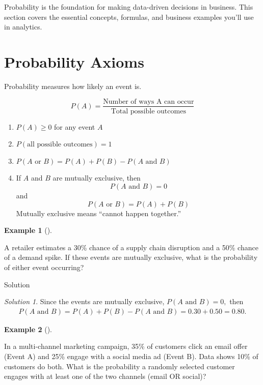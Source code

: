 \documentclass[
  12pt,
  letterpaper,
]{scrbook}
\providecommand{\tightlist}{%
  \setlength{\itemsep}{0pt}\setlength{\parskip}{0pt}}
\renewcommand{\tightlist}{\setlength{\itemsep}{0.5\baselineskip}\setlength{\parskip}{0.2\baselineskip}}
\theoremstyle{definition}
\newtheorem{example}{Example}[chapter]
\theoremstyle{plain}
\theoremstyle{remark}
\newtheorem{refsolution}{Solution}[chapter]
\begin{document}
Probability is the foundation for making data-driven decisions in
business. This section covers the essential concepts, formulas, and
business examples you'll use in analytics.

\section{Probability Axioms}\label{probability-axioms}

Probability measures how likely an event is.

\[P(A) = \frac{\text{Number of ways A can occur}}{\text{Total possible outcomes}}\]

\begin{enumerate}
\def\labelenumi{\arabic{enumi}.}
\tightlist
\item
  \(P(A) \geq 0\) for any event \(A\)
\item
  \(P(\text{all possible outcomes}) = 1\)
\item
  \(P(A \text{ or } B) = P(A) + P(B) - P(A\text{ and }B)\)
\item
  If \(A\) and \(B\) are mutually exclusive, then \[
  P(A \text{ and } B) = 0
  \] and \[
  P(A \text{ or } B) = P(A) + P(B)
  \] Mutually exclusive means ``cannot happen together.''
\end{enumerate}

\begin{example}[]\protect\hypertarget{exm-1}{}\label{exm-1}

A retailer estimates a 30\% chance of a supply chain disruption and a
50\% chance of a demand spike. If these events are mutually exclusive,
what is the probability of either event occurring?

\end{example}

Solution

\begin{refsolution}
Since the events are mutually exclusive, \(P(A \text{ and } B)=0,\) then
\[
\begin{split}
P(A \text{ and } B)=P(A)+P(B)-P(A \text{ and } B)=0.30+0.50=0.80.
\end{split}
\]

\label{sol-1}

\end{refsolution}

\begin{example}[]\protect\hypertarget{exm-2}{}\label{exm-2}

In a multi-channel marketing campaign, 35\% of customers click an email
offer (Event A) and 25\% engage with a social media ad (Event B). Data
shows 10\% of customers do both. What is the probability a randomly
selected customer engages with at least one of the two channels (email
OR social)?

\end{example}
\end{document}
